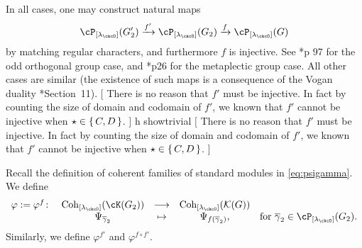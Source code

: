 \documentclass[12pt,a4paper]{amsart}
\newcommand{\trivial}[2][]{\if\relax\detokenize{#1}\relax
  {%
      \color{orange} \vspace{0em} $[$  #2 $]$
      \color{black}
  }
  \else
\ifx#1h
\ifcsname showtrivial\endcsname
{%
    \color{orange} \vspace{0em}  $[$ #2 $]$
    \color{black}
}
\fi
\else {\red Wrong argument!} \fi
\fi
}
\newcommand{\CK}{{\mathcal {K}}}
\numberwithin{equation}{section}
\theoremstyle{remark}
\def\Lamck{[\lambda_\ckcO]}
\def\Coh{\mathrm{Coh}}
\begin{document}
  In all cases, one may construct natural maps
  \[
     \cP_{\Lamck}(G'_{2}) \xrightarrow{f'} \cP_{\Lamck}(G_{2})\xrightarrow{f}\cP_{\Lamck}(G)
  \]
  by matching regular characters, and furthermore $f$ is injective.   %
  See \cite{GI}*{p 97} for the odd orthogonal group case, and \cite{RT2}*{p26} for
  the metaplectic group case. All other cases are similar (the existence of such maps is a consequence of the Vogan duality \cite{V4}*{Section~11}).
    \trivial[]{
    There is no reason that $f'$ must be injective. In fact by counting the size
    of domain and codomain of $f'$, we known that $f'$ cannot be injective when
    $\star\in \set{C,D}$.
  }
  Recall the definition of coherent families of standard modules in
  \eqref{eq:psigamma}. We define
  \begin{equation}\label{eq:cohinj}
    \begin{array}{rcccl}
\varphi:=\varphi^{f}\colon&  \Coh_{\Lamck}(\cK(G_{2})) &\longrightarrow& \Coh_{\Lamck}(\CK(G)) & \\
  &  \Psi_{\olgamma_{2}} & \mapsto & \Psi_{f(\olgamma_{2})}, & \text{for }
  \olgamma_{2}\in \cP_{\Lamck}(G_{2}).
    \end{array}
  \end{equation}
  Similarly, we define $\varphi^{f'}$ and $\varphi^{f\circ f'}$.
\end{document}
